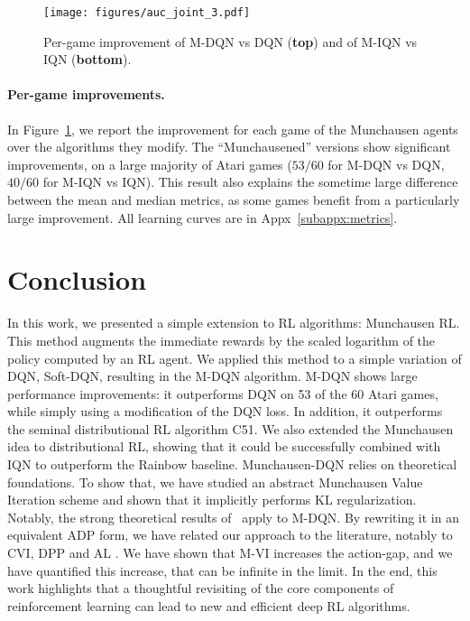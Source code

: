 \documentclass{article}
\begin{document}
\begin{figure}
     \centering
     \texttt{[image: figures/auc\_joint\_3.pdf]}
    \vspace{-4pt}
     \caption{Per-game improvement of M-DQN vs DQN (\textbf{top}) and of M-IQN vs IQN (\textbf{bottom}).}
     \label{fig:aucs}
 \end{figure}
 
\paragraph{Per-game improvements.}
In Figure~\ref{fig:aucs}, we report the improvement for each game of  the Munchausen agents over the algorithms they modify. The ``Munchausened'' versions show significant improvements, on a large majority of Atari games ($53/60$ for M-DQN vs DQN, $40/60$ for M-IQN vs IQN). This result also explains the sometime large difference between the mean and median metrics, as some games benefit from a particularly large improvement.
All learning curves are in Appx~\ref{subappx:metrics}.

 
















\section{Conclusion}
In this work, we presented a simple extension to RL algorithms: Munchausen RL. This method augments the immediate rewards by the scaled logarithm of the policy computed by an RL agent. We applied this method to a simple variation of DQN, Soft-DQN, resulting in the M-DQN algorithm. M-DQN shows large performance improvements: it outperforms DQN on 53 of the 60 Atari games, while simply using a modification of the DQN loss. In addition, it outperforms the seminal distributional RL algorithm C51. We also extended the Munchausen idea to distributional RL, showing that it could be successfully combined with IQN to outperform the Rainbow baseline. Munchausen-DQN relies on theoretical foundations.  To show that, we have studied an abstract Munchausen Value Iteration scheme and shown that it implicitly performs KL regularization. Notably, the strong theoretical results of~\cite{vieillard2020leverage} apply to M-DQN. By rewriting it in an equivalent ADP form, we have related our approach to the literature, notably to CVI, DPP and AL . We have shown that M-VI increases the action-gap, and we have quantified this increase, that can be infinite in the limit. In the end, this  work highlights that a thoughtful revisiting of the core components of reinforcement learning can lead to new and efficient deep RL algorithms.
\end{document}
